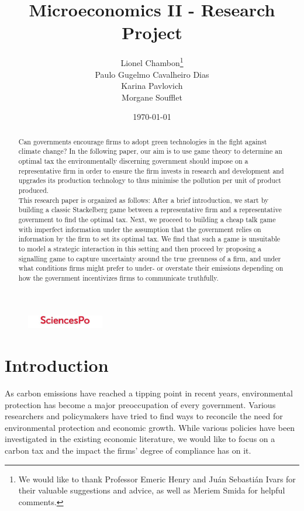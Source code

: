 \documentclass{article}
\title{Microeconomics II - Research Project}
\author{Lionel Chambon\thanks{We would like  to thank Professor Emeric Henry and Juán Sebastián Ivars for their valuable suggestions and advice, as well as Meriem Smida for helpful comments.} \\ Paulo Gugelmo Cavalheiro Dias \\ Karina Pavlovich \\ Morgane Soufflet}
\date{\today}
\begin{document}
\maketitle
\begin{figure}[H]
    \centering
    \includegraphics[width=0.3\textwidth]{./sciences_po.jpg}
\end{figure}

\begin{abstract}
Can governments encourage firms to adopt green technologies in the fight against climate change? In the following paper, our aim is to use game theory to determine an optimal tax the environmentally discerning government should impose on a representative firm in order to ensure the firm invests in research and development and upgrades its production technology to thus minimise the pollution per unit of product produced. \\

This research paper is organized as follows: After a brief introduction, we start by building a classic Stackelberg game between a representative firm and a representative government to find the optimal tax. Next, we  proceed to building a cheap talk game with imperfect information under the assumption that the government relies on information by the firm to set its optimal tax. We find that such a game is unsuitable to model a strategic interaction in this setting and then proceed by proposing a signalling game to capture uncertainty around the true greenness of a firm, and under what conditions firms might prefer to under- or overstate their emissions depending on how the government incentivizes firms to communicate truthfully.
\end{abstract}

\pagebreak
\tableofcontents
\pagebreak

\section{Introduction}

As carbon emissions have reached a tipping point in recent years, environmental protection has become a major preoccupation of every government. Various researchers and policymakers have tried to find ways to reconcile the need for environmental protection and economic growth. While various policies have been investigated in the existing economic literature, we would like to focus on a carbon tax and the impact the firms' degree of compliance has on it.\\
\end{document}
